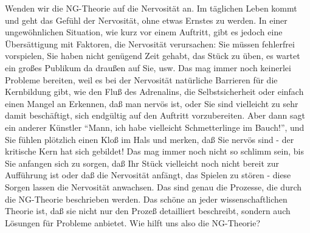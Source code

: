 Wenden wir die NG-Theorie auf die Nervosität an.
Im täglichen Leben kommt und geht das Gefühl der Nervosität, ohne etwas Ernstes zu werden.
In einer ungewöhnlichen Situation, wie kurz vor einem Auftritt, gibt es jedoch eine Übersättigung mit Faktoren, die Nervosität verursachen: Sie müssen fehlerfrei vorspielen, Sie haben nicht genügend Zeit gehabt, das Stück zu üben, es wartet ein großes Publikum da draußen auf Sie, usw.
Das mag immer noch keinerlei Probleme bereiten, weil es bei der Nervosität natürliche Barrieren für die Kernbildung gibt, wie den Fluß des Adrenalins, die Selbstsicherheit oder einfach einen Mangel an Erkennen, daß man nervös ist, oder Sie sind vielleicht zu sehr damit beschäftigt, sich endgültig auf den Auftritt vorzubereiten.
Aber dann sagt ein anderer Künstler \enquote{Mann, ich habe vielleicht Schmetterlinge im Bauch!}, und Sie fühlen plötzlich einen Kloß im Hals und merken, daß Sie nervös sind - der kritische Kern hat sich gebildet!
Das mag immer noch nicht so schlimm sein, bis Sie anfangen sich zu sorgen, daß Ihr Stück vielleicht noch nicht bereit zur Aufführung ist oder daß die Nervosität anfängt, das Spielen zu stören - diese Sorgen lassen die Nervosität anwachsen.
Das sind genau die Prozesse, die durch die NG-Theorie beschrieben werden.
Das schöne an jeder wissenschaftlichen Theorie ist, daß sie nicht nur den Prozeß detailliert beschreibt, sondern auch Lösungen für Probleme anbietet.
Wie hilft uns also die NG-Theorie?

